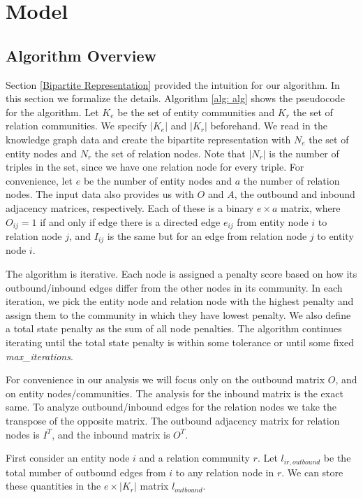 \documentclass[12pt]{article}
\begin{document}
\section{Model}
\label{Model}

\subsection{Algorithm Overview}
\label{Algorithm Overview}

Section \ref{Bipartite Representation} provided the intuition for our algorithm.
In this section we formalize the details. Algorithm \ref{alg: alg} shows the
pseudocode for the algorithm. Let $K_e$ be the set of entity communities and
$K_r$ the set of relation communities. We specify $|K_e|$ and $|K_r|$
beforehand. We read in the knowledge graph data and create the bipartite
representation with $N_e$ the set of entity nodes and $N_r$ the set of relation
nodes. Note that $|N_r|$ is the number of triples in the set, since we have one
relation node for every triple. For convenience, let $e$ be the number of entity
nodes and $a$ the number of relation nodes. The input data also provides us with
$O$ and $A$, the outbound and inbound adjacency matrices, respectively. Each of
these is a binary $e\times a$ matrix, where $O_{ij} = 1$ if and only if edge
there is a directed edge $e_{ij}$ from entity node $i$ to relation node $j$, and
$I_{ij}$ is the same but for an edge from relation node $j$ to entity node $i$.

The algorithm is iterative. Each node is assigned a penalty score based on how
its outbound/inbound edges differ from the other nodes in its community. In each
iteration, we pick the entity node and relation node with the highest penalty
and assign them to the community in which they have lowest penalty. We also
define a total state penalty as the sum of all node penalties. The algorithm
continues iterating until the total state penalty is within some tolerance or
until some fixed \textit{max\_iterations}.

For convenience in our analysis we will focus only on the outbound matrix $O$,
and on entity nodes/communities. The analysis for the inbound matrix is the
exact same. To analyze outbound/inbound edges for the relation nodes we take the
transpose of the opposite matrix. The outbound adjacency matrix for relation
nodes is $I^T$, and the inbound matrix is $O^T$.

First consider an entity node $i$ and a relation community $r$. Let
$l_{ir,outbound}$ be the total number of outbound edges from $i$ to any relation
node in $r$. We can store these quantities in the $e\times |K_r|$ matrix
$l_{outbound}$.
\end{document}
